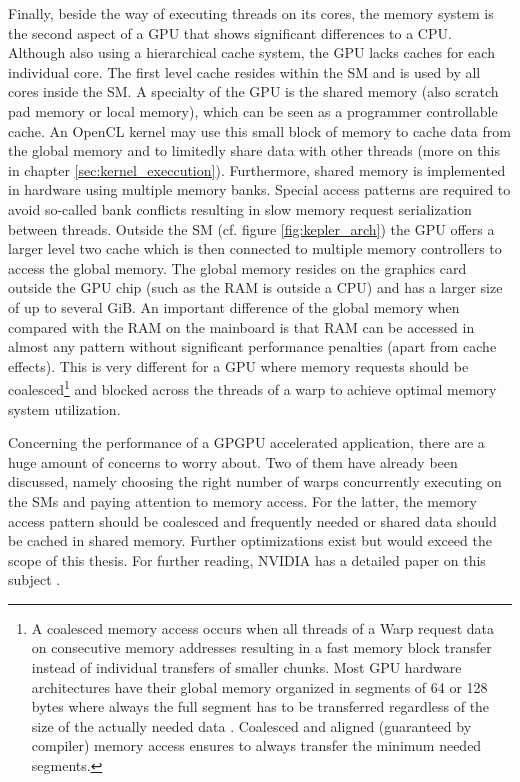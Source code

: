 Finally, beside the way of executing threads on its cores, the memory system is the second aspect of a GPU that shows significant differences to a CPU. Although also using a hierarchical cache system, the GPU lacks caches for each individual core. The first level cache resides within the SM and is used by all cores inside the SM. A specialty of the GPU is the shared memory (also scratch pad memory or local memory), which can be seen as a programmer controllable cache. An OpenCL kernel may use this small block of memory to cache data from the global memory and to limitedly share data with other threads (more on this in chapter \ref{sec:kernel_execcution}). Furthermore, shared memory is implemented in hardware using multiple memory banks. Special access patterns are required to avoid so-called bank conflicts resulting in slow memory request serialization between threads. Outside the SM (cf. figure \ref{fig:kepler_arch}) the GPU offers a larger level two cache which is then connected to multiple memory controllers to access the global memory. The global memory resides on the graphics card outside the GPU chip (such as the RAM is outside a CPU) and has a larger size of up to several GiB. An important difference of the global memory when compared with the RAM on the mainboard is that RAM can be accessed in almost any pattern without significant performance penalties (apart from cache effects). This is very different for a GPU where memory requests should be coalesced\footnote{A coalesced memory access occurs when all threads of a Warp request data on consecutive memory addresses resulting in a fast memory block transfer instead of individual transfers of smaller chunks. Most GPU hardware architectures have their global memory organized in segments of 64 or 128 bytes where always the full segment has to be transferred regardless of the size of the actually needed data \cite[p.13]{nvidia_opencl_best_practices}. Coalesced and aligned (guaranteed by compiler) memory access ensures to always transfer the minimum needed segments.} and blocked across the threads of a warp to achieve optimal memory system utilization.

Concerning the performance of a GPGPU accelerated application, there are a huge amount of concerns to worry about. Two of them have already been discussed, namely choosing the right number of warps concurrently executing on the SMs and paying attention to memory access. For the latter, the memory access pattern should be coalesced and frequently needed or shared data should be cached in shared memory. Further optimizations exist but would exceed the scope of this thesis. For further reading, NVIDIA has a detailed paper on this subject \cite{gpu_optimizations}.

